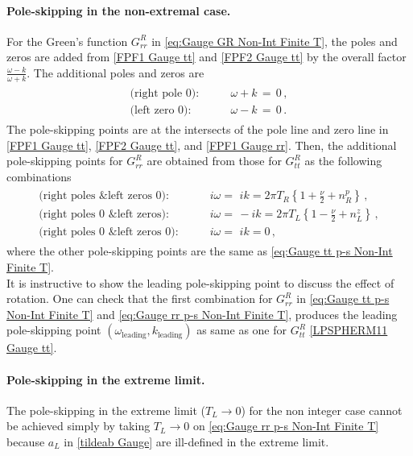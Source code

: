 \documentclass[11pt,a4paper]{article}
\begin{document}
\paragraph{Pole-skipping in the non-extremal case.}
For the Green's function $G^R_{rr}$ in \eqref{eq:Gauge GR Non-Int Finite T}, the poles and zeros are added from \eqref{FPF1 Gauge tt} and \eqref{FPF2 Gauge tt} by the overall factor $\frac{\omega-k}{\omega+k}$. The additional poles and zeros are
\begin{align} \label{FPF1 Gauge rr}
\begin{split}
    \text{(right pole 0):} \qquad & \omega+k \,=\,0\,,\\
    \text{(left zero 0):} \qquad & \omega-k \,=\, 0\,.
\end{split}
\end{align}
The pole-skipping points are at the intersects of the pole line and zero line in \eqref{FPF1 Gauge tt}, \eqref{FPF2 Gauge tt}, and \eqref{FPF1 Gauge rr}. Then, the additional pole-skipping points for $G^R_{rr}$ are obtained from those for $G^R_{tt}$ as the following combinations
\begin{align} \label{eq:Gauge rr p-s Non-Int Finite T}
\begin{split}
\text{(right poles \& left zeros 0):} \qquad &
i \omega = \,\, i k = 2 \pi T_R \left\{ 1 + \frac{\nu}{2} + n^p_R \right\}\,,
\\
\text{(right poles 0 \& left zeros):} \qquad &
i \omega = \, -i k = 2 \pi T_L \left\{ 1 - \frac{\nu}{2} + n^z_L \right\}\,,
\\
\text{(right poles 0 \& left zeros 0):} \qquad &
i \omega = \,\, i k = 0\,,
\end{split}
\end{align}
where the other pole-skipping points are the same as \eqref{eq:Gauge tt p-s Non-Int Finite T}.
\\

It is instructive to show the leading pole-skipping point to discuss the effect of rotation.
One can check that the first combination for $G^R_{rr}$ in \eqref{eq:Gauge tt p-s Non-Int Finite T} and \eqref{eq:Gauge rr p-s Non-Int Finite T}, produces the leading pole-skipping point $(\omega_\text{leading}, k_\text{leading})$ as same as one for $G^R_{tt}$ \eqref{LPSPHERM11 Gauge tt}.


\paragraph{Pole-skipping in the extreme limit.}
The pole-skipping in the extreme limit ($T_L \rightarrow 0$) for the non integer case cannot be achieved simply by taking $T_L \rightarrow 0$ on \eqref{eq:Gauge rr p-s Non-Int Finite T} because $a_L$ in \eqref{tildeab Gauge} are ill-defined in the extreme limit.
\end{document}
